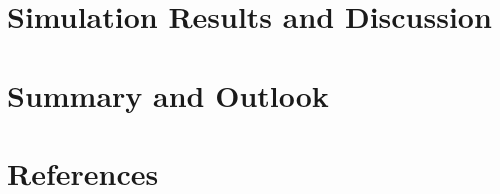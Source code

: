 \documentclass[11pt]{article}
\begin{document}
\section{Simulation Results and Discussion}

\newpage

\section{Summary and Outlook}

\newpage

\section{References}



\appendix





\newpage

\end{document}
